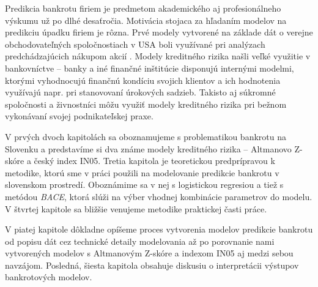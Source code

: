 Predikcia bankrotu firiem je predmetom akademického aj profesionálneho výskumu už po dlhé desaťročia.
Motivácia stojaca za hľadaním modelov na predikciu úpadku firiem je rôzna.
Prvé modely vytvorené na základe dát o verejne obchodovateľných spoločnostiach v USA
boli využívané pri analýzach predchádzajúcich nákupom akcií \cite{altman1968}.
Modely kreditného rizika našli veľké využitie v bankovníctve – banky a iné finančné inštitúcie disponujú internými modelmi,
ktorými vyhodnocujú finančnú kondíciu svojich klientov a ich hodnotenia využívajú napr. pri stanovovaní úrokových sadzieb.
Takisto aj súkromné spoločnosti a živnostníci môžu využiť modely kreditného rizika pri bežnom vykonávaní svojej podnikateľskej praxe.

V prvých dvoch kapitolách sa oboznamujeme s problematikou bankrotu na Slovenku a predstavíme si dva známe modely kreditného rizika – Altmanovo Z-skóre a český index IN05.
Tretia kapitola je teoretickou predprípravou k metodike,
ktorú sme v práci použili na modelovanie predikcie bankrotu v slovenskom prostredí.
Oboznámime sa v nej s logistickou regresiou a tiež s metódou \emph{BACE}, ktorá slúži na výber vhodnej kombinácie parametrov do modelu.
V štvrtej kapitole sa bližšie venujeme metodike praktickej časti práce.

V piatej kapitole dôkladne opíšeme proces vytvorenia modelov predikcie bankrotu
od popisu dát cez technické detaily modelovania až po porovnanie nami vytvorených modelov s Altmanovým Z-skóre a indexom IN05
aj medzi sebou navzájom. Posledná, šiesta kapitola obsahuje diskusiu o interpretácii výstupov bankrotových modelov.